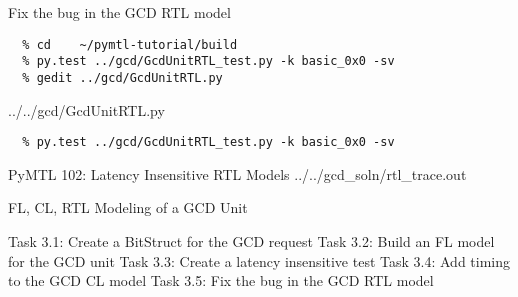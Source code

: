\begin{task}\begin{frame}[fragile]{Fix the bug in the GCD RTL model}
\vspace{-0.25in}
\begin{verbatim}
  % cd    ~/pymtl-tutorial/build
  % py.test ../gcd/GcdUnitRTL_test.py -k basic_0x0 -sv
  % gedit ../gcd/GcdUnitRTL.py
\end{verbatim}

\vspace{-0.2in}
%
{../../gcd/GcdUnitRTL.py}

\vspace{-0.3in}
\begin{verbatim}
  % py.test ../gcd/GcdUnitRTL_test.py -k basic_0x0 -sv
\end{verbatim}
\end{frame}
\end{task}

\begin{frame}{PyMTL 102: Latency Insensitive RTL Models}
\vspace{-0.25in}
%
{../../gcd_soln/rtl_trace.out}

\end{frame}


\begin{frame}{ FL, CL, RTL Modeling of a GCD Unit}
\begin{cbxlist}
  \1 Task 3.1: Create a BitStruct for the GCD request
  \1 Task 3.2: Build an FL model for the GCD unit
  \1 Task 3.3: Create a latency insensitive test
  \1 Task 3.4: Add timing to the GCD CL model
  \1 Task 3.5: Fix the bug in the GCD RTL model
  \1 
  \1 
\end{cbxlist}
\end{frame}

